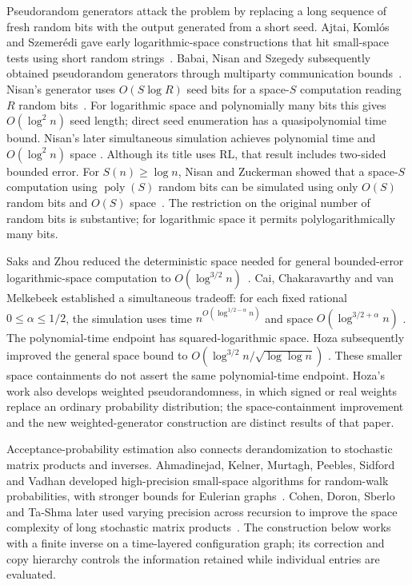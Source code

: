 Pseudorandom generators attack the problem by replacing a long sequence
of fresh random bits with the output generated from a short seed.
Ajtai, Koml\'os and Szemer\'edi gave early logarithmic-space
constructions that hit small-space tests using short random
strings~\cite{AjtaiKomlosSzemeredi1987}. Babai, Nisan and Szegedy
subsequently obtained pseudorandom generators through multiparty
communication bounds~\cite{BabaiNisanSzegedy1992}.
Nisan's generator uses $O(S\log R)$ seed bits for a space-$S$
computation reading $R$ random bits~\cite{Nisan1992}.
For logarithmic space and polynomially many bits this gives
$O(\log^2 n)$ seed length; direct seed enumeration has a
quasipolynomial time bound. Nisan's later simultaneous simulation
achieves polynomial time and $O(\log^2 n)$ space
\cite{Nisan1994RLinSC}. Although its title uses $\mathrm{RL}$,
that result includes two-sided bounded error.
For $S(n)\ge\log n$, Nisan and Zuckerman showed that a space-$S$
computation using $\operatorname{poly}(S)$ random bits can be simulated
using only $O(S)$ random bits and $O(S)$ space~\cite{NisanZuckerman1996}.
The restriction on the original number of random bits is substantive;
for logarithmic space it permits polylogarithmically many bits.

Saks and Zhou reduced the deterministic space needed for general
bounded-error logarithmic-space computation to
$O(\log^{3/2}n)$~\cite{SaksZhou1999}.
Cai, Chakaravarthy and van Melkebeek established a simultaneous
tradeoff: for each fixed rational $0\le\alpha\le1/2$, the simulation
uses time $n^{O(\log^{1/2-\alpha}n)}$ and space
$O(\log^{3/2+\alpha}n)$
\cite{CaiChakaravarthyVanMelkebeek2006}.
The polynomial-time endpoint has squared-logarithmic space.
Hoza subsequently improved the general space bound to
$O(\log^{3/2}n/\sqrt{\log\log n})$
\cite[Theorem~1.6 and Corollary~A.5]{Hoza2021}.
These smaller space containments do not assert the same polynomial-time
endpoint. Hoza's work also develops weighted pseudorandomness, in which
signed or real weights replace an ordinary probability distribution;
the space-containment improvement and the new weighted-generator
construction are distinct results of that paper.

Acceptance-probability estimation also connects derandomization to
stochastic matrix products and inverses. Ahmadinejad, Kelner, Murtagh,
Peebles, Sidford and Vadhan developed high-precision small-space
algorithms for random-walk probabilities, with stronger bounds for
Eulerian graphs~\cite{AhmadinejadKelnerMurtaghPeeblesSidfordVadhan2020}.
Cohen, Doron, Sberlo and Ta-Shma later used varying precision across
recursion to improve the space complexity of long stochastic matrix
products~\cite{CohenDoronSberloTaShma2023}. The construction below
works with a finite inverse on a time-layered configuration graph;
its correction and copy hierarchy controls the information retained
while individual entries are evaluated.

